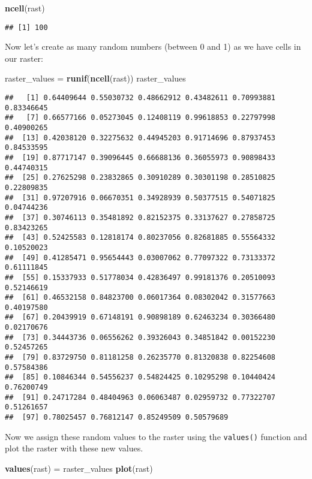 \documentclass[]{article}
\newenvironment{Shaded}{\begin{snugshade}}{\end{snugshade}}
\newcommand{\KeywordTok}[1]{\textcolor[rgb]{0.13,0.29,0.53}{\textbf{#1}}}
\newcommand{\NormalTok}[1]{#1}
\newcommand{\StringTok}[1]{\textcolor[rgb]{0.31,0.60,0.02}{#1}}
\begin{document}
\begin{Shaded}
\begin{Highlighting}[]
\KeywordTok{ncell}\NormalTok{(rast)}
\end{Highlighting}
\end{Shaded}

\begin{verbatim}
## [1] 100
\end{verbatim}

Now let's create as many random numbers (between 0 and 1) as we have
cells in our raster:

\begin{Shaded}
\begin{Highlighting}[]
\NormalTok{raster_values =}\StringTok{ }\KeywordTok{runif}\NormalTok{(}\KeywordTok{ncell}\NormalTok{(rast))}
\NormalTok{raster_values}
\end{Highlighting}
\end{Shaded}

\begin{verbatim}
##   [1] 0.64409644 0.55030732 0.48662912 0.43482611 0.70993881 0.83346645
##   [7] 0.66577166 0.05273045 0.12408119 0.99618853 0.22797998 0.40900265
##  [13] 0.42038120 0.32275632 0.44945203 0.91714696 0.87937453 0.84533595
##  [19] 0.87717147 0.39096445 0.66688136 0.36055973 0.90898433 0.44740315
##  [25] 0.27625298 0.23832865 0.30910289 0.30301198 0.28510825 0.22809835
##  [31] 0.97207916 0.06670351 0.34928939 0.50377515 0.54071825 0.04744236
##  [37] 0.30746113 0.35481892 0.82152375 0.33137627 0.27858725 0.83423265
##  [43] 0.52425583 0.12818174 0.80237056 0.82681885 0.55564332 0.10520023
##  [49] 0.41285471 0.95654443 0.03007062 0.77097322 0.73133372 0.61111845
##  [55] 0.15337933 0.51778034 0.42836497 0.99181376 0.20510093 0.52146619
##  [61] 0.46532158 0.84823700 0.06017364 0.08302042 0.31577663 0.40197580
##  [67] 0.20439919 0.67148191 0.90898189 0.62463234 0.30366480 0.02170676
##  [73] 0.34443736 0.06556262 0.39326043 0.34851842 0.00152230 0.52457265
##  [79] 0.83729750 0.81181258 0.26235770 0.81320838 0.82254608 0.57584386
##  [85] 0.10846344 0.54556237 0.54824425 0.10295298 0.10440424 0.76200749
##  [91] 0.24717284 0.48404963 0.06063487 0.02959732 0.77322707 0.51261657
##  [97] 0.78025457 0.76812147 0.85249509 0.50579689
\end{verbatim}

Now we assign these random values to the raster using the
\texttt{values()} function and plot the raster with these new values.

\begin{Shaded}
\begin{Highlighting}[]
\KeywordTok{values}\NormalTok{(rast) =}\StringTok{ }\NormalTok{raster_values}
\KeywordTok{plot}\NormalTok{(rast)}
\end{Highlighting}
\end{Shaded}
\end{document}
